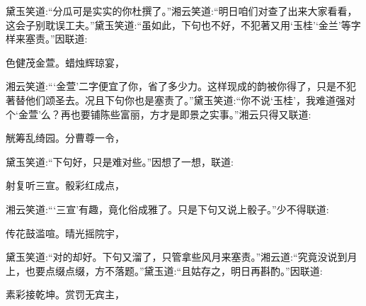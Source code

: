 \begin{parag}
    黛玉笑道:“分瓜可是实实的你杜撰了。”湘云笑道:“明日咱们对查了出来大家看看，这会子别耽误工夫。”黛玉笑道:“虽如此，下句也不好，不犯著又用‘玉桂’‘金兰’等字样来塞责。”因联道:
\end{parag}


\begin{poem}
    \begin{pl}色健茂金萱。蜡烛辉琼宴，\end{pl}
\end{poem}


\begin{parag}
    湘云笑道:“‘金萱’二字便宜了你，省了多少力。这样现成的韵被你得了，只是不犯著替他们颂圣去。况且下句你也是塞责了。”黛玉笑道:“你不说‘玉桂’，我难道强对个‘金萱’么？再也要铺陈些富丽，方才是即景之实事。”湘云只得又联道:
\end{parag}


\begin{poem}
    \begin{pl}觥筹乱绮园。分曹尊一令，\end{pl}
\end{poem}


\begin{parag}
    黛玉笑道:“下句好，只是难对些。”因想了一想，联道:
\end{parag}


\begin{poem}
    \begin{pl}射复听三宣。骰彩红成点，\end{pl}
\end{poem}


\begin{parag}
    湘云笑道:“‘三宣’有趣，竟化俗成雅了。只是下句又说上骰子。”少不得联道:
\end{parag}


\begin{poem}
    \begin{pl}传花鼓滥喧。晴光摇院宇，\end{pl}
\end{poem}


\begin{parag}
    黛玉笑道:“对的却好。下句又溜了，只管拿些风月来塞责。”湘云道:“究竟没说到月上，也要点缀点缀，方不落题。”黛玉道:“且姑存之，明日再斟酌。”因联道:
\end{parag}


\begin{poem}
    \begin{pl}素彩接乾坤。赏罚无宾主，\end{pl}
\end{poem}


